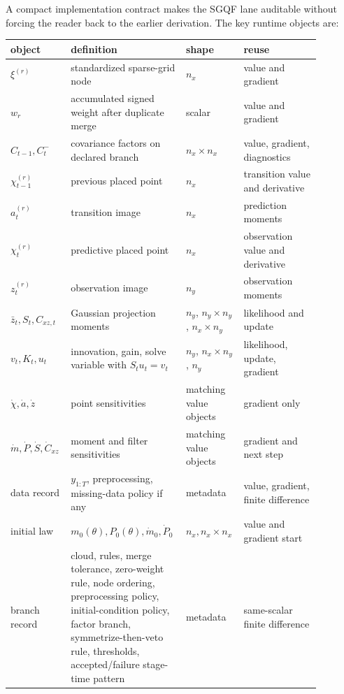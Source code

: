 A compact implementation contract makes the SGQF lane auditable without forcing
the reader back to the earlier derivation.  The key runtime objects are:
\begin{center}
\small
\begin{tabular}{p{0.18\linewidth}p{0.30\linewidth}p{0.16\linewidth}p{0.24\linewidth}}
\toprule
object & definition & shape & reuse \\
\midrule
\(\xi^{(r)}\) & standardized sparse-grid node & \(n_x\) & value and gradient \\
\(w_r\) & accumulated signed weight after duplicate merge & scalar & value and gradient \\
\(C_{t-1},C_t^-\) & covariance factors on declared branch & \(n_x\times n_x\) & value, gradient, diagnostics \\
\(\chi_{t-1}^{(r)}\) & previous placed point & \(n_x\) & transition value and derivative \\
\(a_t^{(r)}\) & transition image & \(n_x\) & prediction moments \\
\(\chi_t^{(r)}\) & predictive placed point & \(n_x\) & observation value and derivative \\
\(z_t^{(r)}\) & observation image & \(n_y\) & observation moments \\
\(\bar z_t,S_t,C_{xz,t}\) & Gaussian projection moments & \(n_y\), \(n_y\times n_y\), \(n_x\times n_y\) & likelihood and update \\
\(v_t,K_t,u_t\) & innovation, gain, solve variable with \(S_tu_t=v_t\) & \(n_y\), \(n_x\times n_y\), \(n_y\) & likelihood, update, gradient \\
\(\dot\chi,\dot a,\dot z\) & point sensitivities & matching value objects & gradient only \\
\(\dot m,\dot P,\dot S,\dot C_{xz}\) & moment and filter sensitivities & matching value objects & gradient and next step \\
data record & \(y_{1:T}\), preprocessing, missing-data policy if any & metadata & value, gradient, finite difference \\
initial law & \(m_0(\theta),P_0(\theta),\dot m_0,\dot P_0\) & \(n_x,n_x\times n_x\) & value and gradient start \\
branch record & cloud, rules, merge tolerance, zero-weight rule, node ordering, preprocessing policy, initial-condition policy, factor branch, symmetrize-then-veto rule, thresholds, accepted/failure stage-time pattern & metadata & same-scalar finite difference \\
\bottomrule
\end{tabular}
\end{center}

